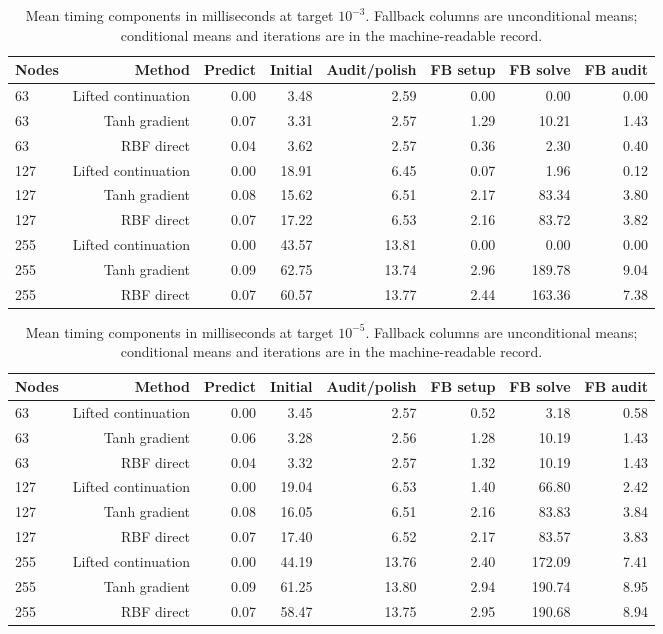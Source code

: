 \begin{table}[tbp]\centering\scriptsize
\caption{Mean timing components in milliseconds at target $10^{-3}$. Fallback columns are unconditional means; conditional means and iterations are in the machine-readable record.}
\label{tab:r24-components-0.001}
\begin{tabular}{lrrrrrrr}
\toprule
Nodes & Method & Predict & Initial & Audit/polish & FB setup & FB solve & FB audit\\
\midrule
63 & Lifted continuation & 0.00 & 3.48 & 2.59 & 0.00 & 0.00 & 0.00\\
63 & Tanh gradient & 0.07 & 3.31 & 2.57 & 1.29 & 10.21 & 1.43\\
63 & RBF direct & 0.04 & 3.62 & 2.57 & 0.36 & 2.30 & 0.40\\
127 & Lifted continuation & 0.00 & 18.91 & 6.45 & 0.07 & 1.96 & 0.12\\
127 & Tanh gradient & 0.08 & 15.62 & 6.51 & 2.17 & 83.34 & 3.80\\
127 & RBF direct & 0.07 & 17.22 & 6.53 & 2.16 & 83.72 & 3.82\\
255 & Lifted continuation & 0.00 & 43.57 & 13.81 & 0.00 & 0.00 & 0.00\\
255 & Tanh gradient & 0.09 & 62.75 & 13.74 & 2.96 & 189.78 & 9.04\\
255 & RBF direct & 0.07 & 60.57 & 13.77 & 2.44 & 163.36 & 7.38\\
\bottomrule
\end{tabular}
\end{table}

\begin{table}[tbp]\centering\scriptsize
\caption{Mean timing components in milliseconds at target $10^{-5}$. Fallback columns are unconditional means; conditional means and iterations are in the machine-readable record.}
\label{tab:r24-components-1e-05}
\begin{tabular}{lrrrrrrr}
\toprule
Nodes & Method & Predict & Initial & Audit/polish & FB setup & FB solve & FB audit\\
\midrule
63 & Lifted continuation & 0.00 & 3.45 & 2.57 & 0.52 & 3.18 & 0.58\\
63 & Tanh gradient & 0.06 & 3.28 & 2.56 & 1.28 & 10.19 & 1.43\\
63 & RBF direct & 0.04 & 3.32 & 2.57 & 1.32 & 10.19 & 1.43\\
127 & Lifted continuation & 0.00 & 19.04 & 6.53 & 1.40 & 66.80 & 2.42\\
127 & Tanh gradient & 0.08 & 16.05 & 6.51 & 2.16 & 83.83 & 3.84\\
127 & RBF direct & 0.07 & 17.40 & 6.52 & 2.17 & 83.57 & 3.83\\
255 & Lifted continuation & 0.00 & 44.19 & 13.76 & 2.40 & 172.09 & 7.41\\
255 & Tanh gradient & 0.09 & 61.25 & 13.80 & 2.94 & 190.74 & 8.95\\
255 & RBF direct & 0.07 & 58.47 & 13.75 & 2.95 & 190.68 & 8.94\\
\bottomrule
\end{tabular}
\end{table}

